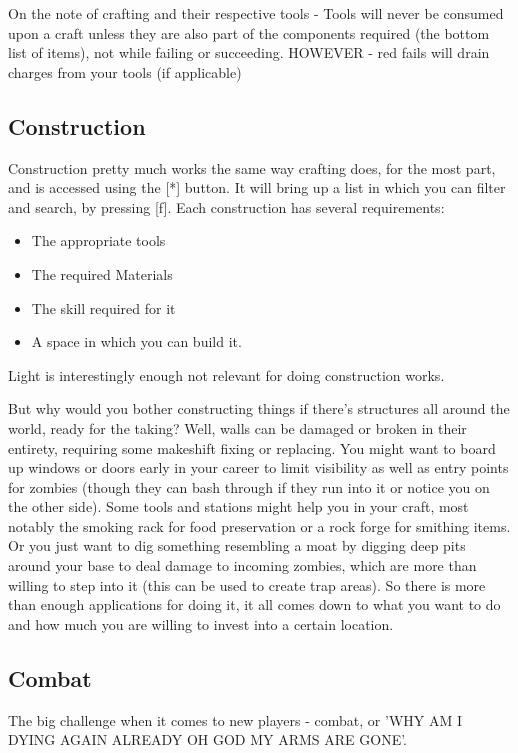 On the note of crafting and their respective tools - Tools will never be consumed upon a craft unless they are also part of the components required (the bottom list of items), not while failing or succeeding. HOWEVER - red fails will drain charges from your tools (if applicable)

\subsection{Construction}

Construction pretty much works the same way crafting does, for the most part, and is accessed using the [*] button. It will bring up a list in which you can filter and search, by pressing [f]. Each construction has several requirements:

\begin{itemize}
\item The appropriate tools
\item The required Materials
\item The skill required for it
\item A space in which you can build it.
\end{itemize}

Light is interestingly enough not relevant for doing construction works.

But why would you bother constructing things if there's structures all around the world, ready for the taking? Well, walls can be damaged or broken in their entirety, requiring some makeshift fixing or replacing. You might want to board up windows or doors early in your career to limit visibility as well as entry points for zombies (though they can bash through if they run into it or notice you on the other side). Some tools and stations might help you in your craft, most notably the smoking rack for food preservation or a rock forge for smithing items. Or you just want to dig something resembling a moat by digging deep pits around your base to deal damage to incoming zombies, which are more than willing to step into it (this can be used to create trap areas). So there is more than enough applications for doing it, it all comes down to what you want to do and how much you are willing to invest into a certain location.

\subsection{Combat}

The big challenge when it comes to new players - combat, or 'WHY AM I DYING AGAIN ALREADY OH GOD MY ARMS ARE GONE'.

